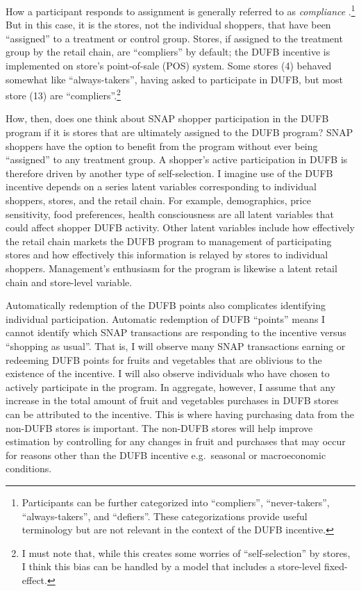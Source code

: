 \documentclass[12pt,letterpaperpaper,]{book}
\begin{document}
How a participant responds to assignment is generally referred to as
\emph{compliance} \citep{angrist_mostly_2008}.\footnote{Participants can
  be further categorized into ``compliers'', ``never-takers'',
  ``always-takers'', and ``defiers''. These categorizations provide
  useful terminology but are not relevant in the context of the DUFB
  incentive.} But in this case, it is the stores, not the individual
shoppers, that have been ``assigned'' to a treatment or control group.
Stores, if assigned to the treatment group by the retail chain, are
``compliers'' by default; the DUFB incentive is implemented on store's
point-of-sale (POS) system. Some stores (4) behaved somewhat like
``always-takers'', having asked to participate in DUFB, but most store
(13) are ``compliers''.\footnote{I must note that, while this creates
  some worries of ``self-selection'' by stores, I think this bias can be
  handled by a model that includes a store-level fixed-effect.}

How, then, does one think about SNAP shopper participation in the DUFB
program if it is stores that are ultimately assigned to the DUFB
program? SNAP shoppers have the option to benefit from the program
without ever being ``assigned'' to any treatment group. A shopper's
active participation in DUFB is therefore driven by another type of
self-selection. I imagine use of the DUFB incentive depends on a series
latent variables corresponding to individual shoppers, stores, and the
retail chain. For example, demographics, price sensitivity, food
preferences, health consciousness are all latent variables that could
affect shopper DUFB activity. Other latent variables include how
effectively the retail chain markets the DUFB program to management of
participating stores and how effectively this information is relayed by
stores to individual shoppers. Management's enthusiasm for the program
is likewise a latent retail chain and store-level variable.

Automatically redemption of the DUFB points also complicates identifying
individual participation. Automatic redemption of DUFB ``points'' means
I cannot identify which SNAP transactions are responding to the
incentive versus ``shopping as usual''. That is, I will observe many
SNAP transactions earning or redeeming DUFB points for fruits and
vegetables that are oblivious to the existence of the incentive. I will
also observe individuals who have chosen to actively participate in the
program. In aggregate, however, I assume that any increase in the total
amount of fruit and vegetables purchases in DUFB stores can be
attributed to the incentive. This is where having purchasing data from
the non-DUFB stores is important. The non-DUFB stores will help improve
estimation by controlling for any changes in fruit and purchases that
may occur for reasons other than the DUFB incentive e.g.~seasonal or
macroeconomic conditions.
\end{document}

